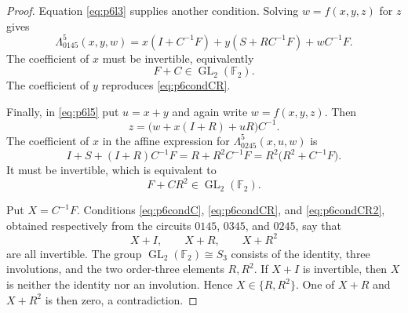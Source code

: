 \documentclass[10pt,a4paper]{amsart}
\newcommand{\F}{\mathbb F}
\newcommand{\GL}{\operatorname{GL}}
\begin{document}
\begin{proof}
Equation \eqref{eq:p6l3} supplies another condition. Solving
$w=f(x,y,z)$ for $z$ gives
\[
\Lambda_{0145}^5(x,y,w)=x(I+C^{-1}F)+y(S+RC^{-1}F)+wC^{-1}F.
\]
The coefficient of $x$ must be invertible, equivalently
\begin{equation}\label{eq:p6condC}
F+C\in\GL_2(\F_2).
\end{equation}
The coefficient of $y$ reproduces \eqref{eq:p6condCR}.

Finally, in \eqref{eq:p6l5} put $u=x+y$ and again write $w=f(x,y,z)$.
Then
\[
z=\bigl(w+x(I+R)+uR\bigr)C^{-1}.
\]
The coefficient of $x$ in the affine expression for
$\Lambda_{0245}^{5}(x,u,w)$ is
\[
I+S+(I+R)C^{-1}F
=R+R^2C^{-1}F
=R^2\bigl(R^2+C^{-1}F\bigr).
\]
It must be invertible, which is equivalent to
\begin{equation}\label{eq:p6condCR2}
F+CR^2\in\GL_2(\F_2).
\end{equation}

Put $X=C^{-1}F$. Conditions \eqref{eq:p6condC}, \eqref{eq:p6condCR}, and
\eqref{eq:p6condCR2}, obtained respectively from the circuits $0145$, $0345$,
and $0245$, say that
\[
X+I,\qquad X+R,\qquad X+R^2
\]
are all invertible. The group $\GL_2(\F_2)\cong S_3$ consists of the identity,
three involutions, and the two order-three elements $R,R^2$. If $X+I$ is
invertible, then $X$ is neither the identity nor an involution. Hence
$X\in\{R,R^2\}$. One of $X+R$ and $X+R^2$ is then zero, a contradiction.
\end{proof}
\end{document}
